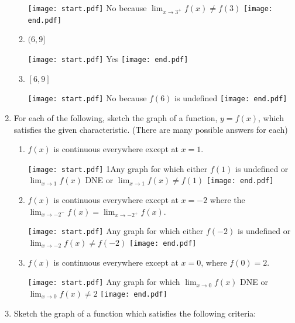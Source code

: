 \documentclass[12pt]{article}
\begin{document}
\begin{enumerate}
\begin{enumerate}
\texttt{[image: start.pdf]}
{{No because $\displaystyle \lim_{x\rightarrow 3^+}{f(x)} \neq f(3)$}}
\texttt{[image: end.pdf]}


\item $(6,9]$

\texttt{[image: start.pdf]}
{{Yes}}
\texttt{[image: end.pdf]}


\item $[6,9]$

\texttt{[image: start.pdf]}
{{No because $f(6)$ is undefined}}
\texttt{[image: end.pdf]}


\end{enumerate}

\item For each of the following, sketch the graph of a function, $y=f(x)$, which satisfies the given characteristic.  (There are many possible answers for each)

\begin{enumerate}

\item $f(x)$ is continuous everywhere except at $x=1$.

\texttt{[image: start.pdf]}
{{{1\linewidth}{Any graph for which either $f(1)$ is undefined or $\displaystyle \lim_{x \rightarrow 1}{f(x)}$ DNE or $\displaystyle \lim_{x \rightarrow 1}{f(x)} \neq f(1)$}}}
\texttt{[image: end.pdf]}


\item $f(x)$ is continuous everywhere except at $x=-2$ where the $\displaystyle \lim_{x \rightarrow -2^-}{f(x)}=\lim_{x \rightarrow -2^+}{f(x)}$.

\texttt{[image: start.pdf]}
{{Any graph for which either $f(-2)$ is undefined or $\displaystyle \lim_{x \rightarrow -2}{f(x)} \neq f(-2)$}}
\texttt{[image: end.pdf]}


\item $f(x)$ is continuous everywhere except at $x=0$, where $f(0)=2$.

\texttt{[image: start.pdf]}
{{Any graph for which $\displaystyle \lim_{x \rightarrow 0}{f(x)}$ DNE or $\displaystyle \lim_{x \rightarrow 0}{f(x)} \neq 2$}}
\texttt{[image: end.pdf]}


\end{enumerate}

\newpage

\item Sketch the graph of a function which satisfies the following criteria:

\begin{itemize}


\end{itemize}
\end{enumerate}
\end{document}
